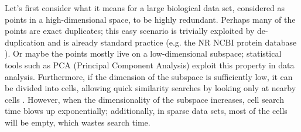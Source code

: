 \documentclass[review,preprint,12pt]{elsarticle}
\renewcommand{\cite}{\citep} %
\theoremstyle{definition}
\theoremstyle{remark}
\numberwithin{equation}{section}
\begin{document}
Let's first consider what it means for a large biological data set, considered as points in a high-dimensional space, to be highly redundant.
Perhaps many of the points are exact duplicates; this easy scenario is trivially exploited by de-duplication and is already standard practice (e.g. the NR NCBI protein database \cite{pruitt2005ncbi}).
Or maybe the points mostly live on a low-dimensional subspace; statistical tools such as PCA (Principal Component Analysis) exploit this property in data analysis.
Furthermore, if the dimension of the subspace is sufficiently low,
it can be divided into cells, allowing quick similarity searches by looking only at nearby cells \cite{weber1998quantitative}.
However, when the dimensionality of the subspace increases, cell search time blows up exponentially; additionally, in sparse data sets, most of the cells will be empty, which wastes search time.
\end{document}
